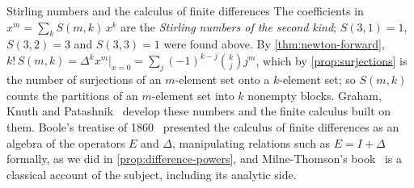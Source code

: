 \begin{table}
\end{table}

\begin{note}{Stirling numbers and the calculus of finite differences}
The coefficients in $x^m=\sum_kS(m,k)\,x^{\underline k}$ are the \emph{Stirling numbers of the second kind}; $S(3,1)=1$, $S(3,2)=3$ and $S(3,3)=1$ were found above. By \cref{thm:newton-forward}, $k!\,S(m,k)=\Delta^kx^m|_{x=0}=\sum_j(-1)^{k-j}\binom kjj^m$, which by \cref{prop:surjections} is the number of surjections of an $m$-element set onto a $k$-element set; so $S(m,k)$ counts the partitions of an $m$-element set into $k$ nonempty blocks. Graham, Knuth and Patashnik~\cite[Sects.~2.6 and~6.1]{graham1994concrete} develop these numbers and the finite calculus built on them. Boole's treatise of 1860~\cite{boole1860} presented the calculus of finite differences as an algebra of the operators $E$ and $\Delta$, manipulating relations such as $E=I+\Delta$ formally, as we did in \cref{prop:difference-powers}, and Milne-Thomson's book~\cite{milnethomson1933} is a classical account of the subject, including its analytic side.
\end{note}

